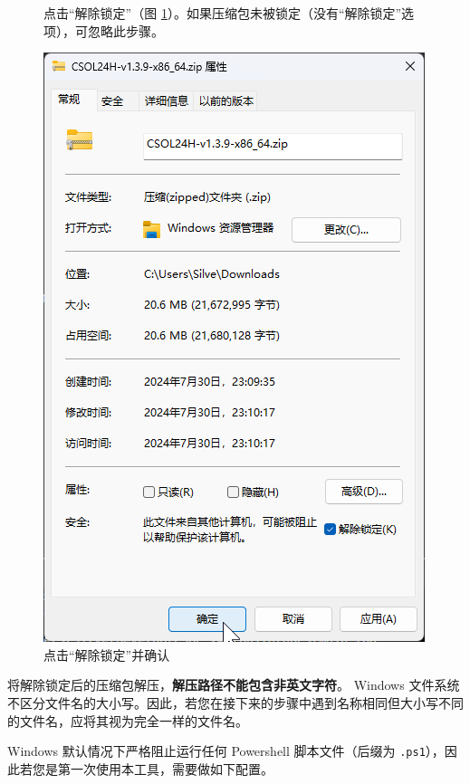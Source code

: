 \begin{figure}[H]
    \Centering
    \parbox[l]{\textwidth}{点击“解除锁定”（图 \ref{ch0fig-unlock-1}）。如果压缩包未被锁定（没有“解除锁定”选项），可忽略此步骤。}
    \includegraphics[width=\textwidth]{docs/assets/intro/unlock_01.png}
    \caption{点击“解除锁定”并确认}
    \label{ch0fig-unlock-1}
\end{figure}

将解除锁定后的压缩包解压，\textbf{\color{red}解压路径不能包含非英文字符}。
Windows 文件系统不区分文件名的大小写。因此，若您在接下来的步骤中遇到名称相同但大小写不同的文件名，应将其视为完全一样的文件名。

Windows 默认情况下严格阻止运行任何 Powershell 脚本文件（后缀为 \lstinline{.ps1}），因此若您是第一次使用本工具，需要做如下配置。

